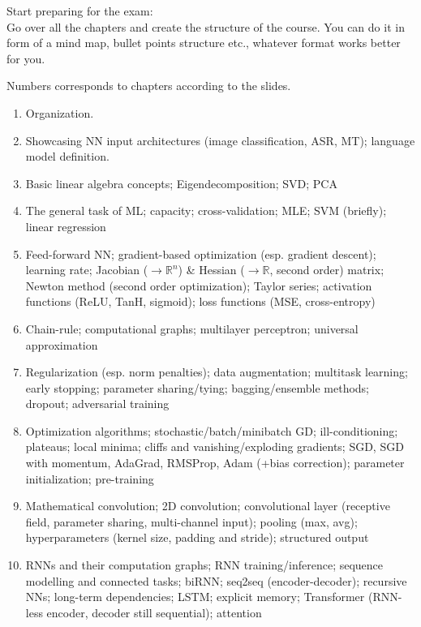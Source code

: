\begin{exercise}

Start preparing for the exam: \\
Go over all the chapters and create the structure of the course.
You can do it in form of a mind map, bullet points structure etc., whatever format works better for you.

\end{exercise}


\begin{solution}
    Numbers corresponds to chapters according to the slides.
    \begin{enumerate}[label=\hspace{-0.8cm}\textbf{Ch. \arabic*}, align=left]
        \item Organization.
        \item Showcasing NN input architectures (image classification, ASR, MT); language model definition.
        \item Basic linear algebra concepts; Eigendecomposition; SVD; PCA
        \item The general task of ML; capacity; cross-validation; MLE; SVM (briefly); linear regression
        \item Feed-forward NN; gradient-based optimization (esp. gradient descent); learning rate; Jacobian ($\rightarrow \mathbb{R}^n$) \& Hessian ($\rightarrow \mathbb{R}$, second order) matrix; Newton method (second order optimization); Taylor series; activation functions (ReLU, TanH, sigmoid); loss functions (MSE, cross-entropy)
        \item Chain-rule; computational graphs; multilayer perceptron; universal approximation
        \item Regularization (esp. norm penalties); data augmentation; multitask learning; early stopping; parameter sharing/tying; bagging/ensemble methods; dropout; adversarial training
        \item Optimization algorithms; stochastic/batch/minibatch GD; ill-conditioning; plateaus; local minima; cliffs and vanishing/exploding gradients; SGD, SGD with momentum, AdaGrad, RMSProp, Adam (+bias correction); parameter initialization; pre-training
        \item Mathematical convolution; 2D convolution; convolutional layer (receptive field, parameter sharing, multi-channel input); pooling (max, avg); hyperparameters (kernel size, padding and stride); structured output
        \item RNNs and their computation graphs; RNN training/inference; sequence modelling and connected tasks; biRNN; seq2seq (encoder-decoder); recursive NNs; long-term dependencies; LSTM; explicit memory; Transformer (RNN-less encoder, decoder still sequential); attention
    \end{enumerate}
\end{solution}



